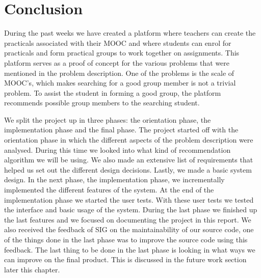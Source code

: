 \chapter{Conclusion}
\label{sec:conclusion}
During the past weeks we have created a platform where teachers can create the practicals associated with their MOOC and where students can enrol for practicals and form practical groups to work together on assignments.
This platform serves as a proof of concept for the various problems that were mentioned in the problem description.
One of the problems is the scale of MOOC's, which makes searching for a good group member is not a trivial problem.
To assist the student in forming a good group, the platform recommends possible group members to the searching student.

We split the project up in three phases: the orientation phase, the implementation phase and the final phase.
The project started off with the orientation phase in which the different aspects of the problem description were analysed.
During this time we looked into what kind of recommendation algorithm we will be using.
We also made an extensive list of requirements that helped us set out the different design decisions.
Lastly, we made a basic system design.
In the next phase, the implementation phase, we incrementally implemented the different features of the system.
At the end of the implementation phase we started the user tests.
With these user tests we tested the interface and basic usage of the system.
During the last phase we finished up the last features and we focused on documenting the project in this report.
We also received the feedback of SIG on the maintainability of our source code, one of the things done in the last phase was to improve the source code using this feedback.
The last thing to be done in the last phase is looking in what ways we can improve on the final product.
This is discussed in the future work section later this chapter.

